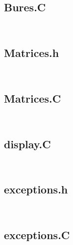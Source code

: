 \texttt{
\sloppy
\small
}

\subsection{Bures.C}

\texttt{
\sloppy
\small
}

\subsection{Matrices.h}

\texttt{
\sloppy
\small
}

\subsection{Matrices.C}

\texttt{
\sloppy
\small
}

\subsection{display.C}

\texttt{
\sloppy
\small
}

\subsection{exceptions.h}

\texttt{
\sloppy
\small
}

\subsection{exceptions.C}

\texttt{
\sloppy
\small
}

